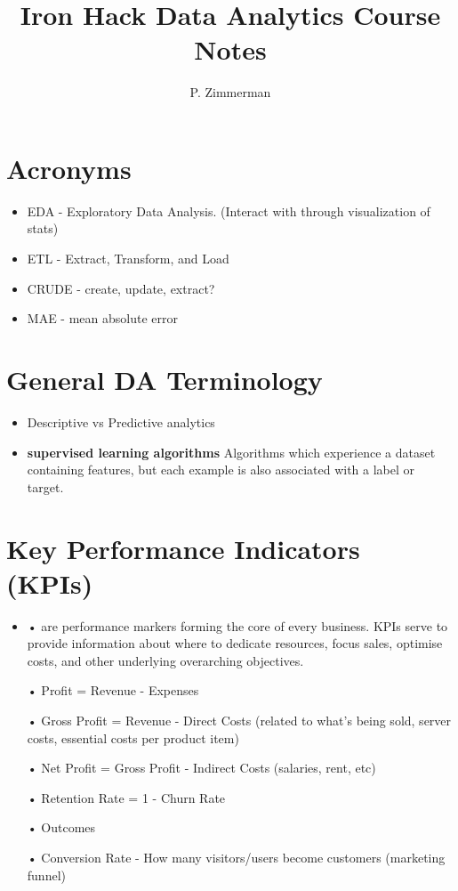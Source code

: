 \documentclass[11pt, oneside]{article}   	%
\title{Iron Hack Data Analytics Course Notes}
\author{P. Zimmerman}
\begin{document}
\maketitle
\section{Acronyms}
\begin{itemize}
\item EDA \-- Exploratory Data Analysis. (Interact with through visualization of stats)
\item ETL \-- Extract, Transform, and Load
\item CRUDE \-- create, update, extract?
\item MAE \-- mean absolute error
\end{itemize}

\section{General DA Terminology}
\begin{itemize}
\item  Descriptive vs Predictive analytics 
\item \textbf{supervised learning algorithms} Algorithms which experience a dataset containing features,
but each example is also associated with a label or target.
\end{itemize}

\section{
Key Performance Indicators (KPIs)}
\hspace{1cm}\begin{itemize}
\item
• are performance markers forming the core of every business. KPIs serve to provide information about where to dedicate resources, focus sales, optimise costs, and other underlying overarching objectives.  \newline

• Profit = Revenue - Expenses \newline

• Gross Profit = Revenue - Direct Costs \newline
 (related to what’s being sold, server costs, essential costs per product item) \newline

• Net Profit = Gross Profit - Indirect Costs\newline
 (salaries, rent, etc) \newline

• Retention Rate = 1 - Churn Rate \newline

• Outcomes\newline

• Conversion Rate - How many visitors/users become customers (marketing funnel)
\end{itemize}
\end{document}
